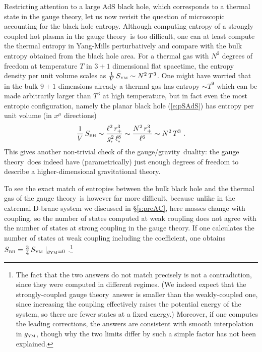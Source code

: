 \documentclass[12pt]{article}
\def\sect#1{\S\ref{#1}}
\def\req#1{(\ref{#1})}
\def\GG{gauge/gravity}
\def\GT{gauge theory}
\def\gst{g_{\scriptscriptstyle {\rm s}}}
\def\gYM{g_{\scriptscriptstyle {\rm YM}}}
\def\lst{\ell_{\scriptscriptstyle {\rm s}}}
\def\Rads{\ell}
\def\rh{r_+}
\def\Sbh{S_{\scriptscriptstyle {\rm BH}}}
\def\Sgt{S_{\scriptscriptstyle {\rm YM}}}
\begin{document}
Restricting attention to a large AdS black hole, which corresponds to a thermal state in the \GT, let us now revisit the question of microscopic accounting for the black hole entropy.  
Although computing entropy of a strongly coupled hot plasma in the \GT\ is too difficult, one can at least compute the thermal entropy in Yang-Mills perturbatively and compare with the bulk entropy obtained from the black hole area.  
For a thermal gas with $N^2$ degrees of freedom at temperature $T$ in $3+1$ dimensional flat spacetime, the entropy density per unit volume scales as $\frac{1}{V} \, \Sgt \sim N^2 \, T^3$.
One might have worried that in the bulk $9+1$ dimensions already a thermal gas has entropy $\sim T^9$ which can be made arbitrarily larger than $T^3$ at high temperature, but in fact even the most entropic configuration, namely the planar black hole \req{e:pSAdS} has entropy per unit volume (in $x^\mu$ directions) 
%
\begin{equation}
\frac{1}{V} \, \Sbh \sim 
\frac{\Rads^2 \, \rh^3}{\gst^2 \, \lst^8} \sim 
\frac{ N^2 \, \rh^3 }{\Rads^6} 
\sim N^2 \, T^3 \ .
\label{e:entropy}
\end{equation}	
%
This gives another non-trivial check of the \GG\ duality: the \GT\ does indeed have (parametrically) just enough degrees of freedom to describe a higher-dimensional gravitational theory.  

To see the exact match of entropies between the bulk black hole and the thermal gas of the \GT\ is however far more difficult, because unlike in the extremal D-brane system we discussed in \sect{s:preAC}, here masses change with coupling, so the number of states computed at weak coupling does not agree with  the number of states at strong coupling in the \GT.  
If one calculates the number of states at weak coupling including the coefficient, one obtains $\Sbh = \frac{3}{4} \, {\Sgt}\mid_{\gYM=0}$ \cite{Gubser:1996de}.\footnote{
The fact that the two answers do not match precisely is not a contradiction, since they were computed in different regimes.  (We indeed expect that the strongly-coupled \GT\ answer is smaller than the weakly-coupled one, since increasing the coupling effectively raises the potential energy of the system, so there are fewer states at a fixed energy.)  Moreover, if one computes the leading corrections, the answers are consistent with smooth interpolation in $\gYM$, though why the two limits differ by such a simple factor has not been explained.}
\end{document}
